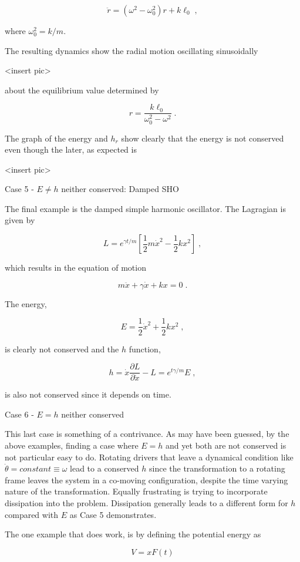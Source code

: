 \documentclass[12pt]{article}
\begin{document}
\[ {\ddot r} = (\omega^2 - \omega_0^2)r + k \ell_0 \; , \]

where $\omega_0^2 = k/m$.  

The resulting dynamics show the radial motion oscillating sinusoidally 

<insert pic>

about the equilibrium value determined by 

\[ r = \frac{k \ell_0}{\omega_0^2 - \omega^2} \; . \]

The graph of the energy and $h_r$ show clearly that the energy is not conserved even though the later, as expected is

<insert pic>

Case 5 - $E \neq h$ neither conserved: Damped SHO

The final example is the damped simple harmonic oscillator.  The Lagragian is given by

\[ L = e^{\gamma t/m} \left[\frac{1}{2} m {\dot x}^2 - \frac{1}{2} k x^2 \right] \; , \]

which results in the equation of motion

\[ m {\ddot x} + \gamma {\dot x} + k x = 0 \; .\]

The energy,

\[ E = \frac{1}{2} {\dot x}^2 + \frac{1}{2} k x^2 \; ,\]

is clearly not conserved and the $h$ function,

\[ h = {\dot x} \frac{\partial L}{\partial \dot x} - L = e^{t \gamma/m} E \; ,\]

is also not conserved since it depends on time.

Case 6 - $E = h$ neither conserved

This last case is something of a contrivance.  As may have been guessed, by the above examples, finding a case where $E=h$ and yet both are not conserved is not particular easy to do.  Rotating drivers that leave a dynamical condition like $\dot \theta = constant \equiv \omega$ lead to a conserved $h$ since the transformation to a rotating frame leaves the system in a co-moving configuration, despite the time varying nature of the transformation.  Equally frustrating is trying to incorporate dissipation into the problem.  Dissipation generally leads to a different form for $h$ compared with $E$ as Case 5 demonstrates.

The one example that does work, is by defining the potential energy as 

\[ V = x F(t) \]
\end{document}
